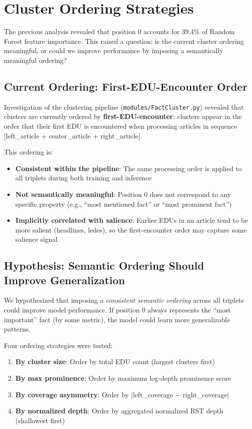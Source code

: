 \documentclass[12pt,a4paper]{article}
\begin{document}
\section{Cluster Ordering Strategies}

The previous analysis revealed that position 0 accounts for 39.4\% of Random Forest feature
importance. This raised a question: is the current cluster ordering meaningful, or could we
improve performance by imposing a semantically meaningful ordering?

\subsection{Current Ordering: First-EDU-Encounter Order}

Investigation of the clustering pipeline (\texttt{modules/FactCluster.py}) revealed that
clusters are currently ordered by \textbf{first-EDU-encounter}: clusters appear in the order
that their first EDU is encountered when processing articles in sequence
[left\_article + center\_article + right\_article].

This ordering is:
\begin{itemize}
\item \textbf{Consistent within the pipeline}: The same processing order is applied to all
      triplets during both training and inference
\item \textbf{Not semantically meaningful}: Position 0 does not correspond to any specific
      property (e.g., ``most mentioned fact'' or ``most prominent fact'')
\item \textbf{Implicitly correlated with salience}: Earlier EDUs in an article tend to be
      more salient (headlines, ledes), so the first-encounter order may capture some salience signal
\end{itemize}

\subsection{Hypothesis: Semantic Ordering Should Improve Generalization}

We hypothesized that imposing a \textit{consistent semantic ordering} across all triplets
could improve model performance. If position 0 always represents the ``most important'' fact
(by some metric), the model could learn more generalizable patterns.

Four ordering strategies were tested:
\begin{enumerate}
\item \textbf{By cluster size}: Order by total EDU count (largest clusters first)
\item \textbf{By max prominence}: Order by maximum log-depth prominence score
\item \textbf{By coverage asymmetry}: Order by $|$left\_coverage $-$ right\_coverage$|$
\item \textbf{By normalized depth}: Order by aggregated normalized RST depth (shallowest first)
\end{enumerate}
\end{document}
